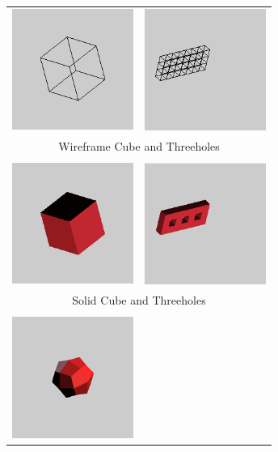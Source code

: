 \documentclass[12pt,a4paper]{scrartcl}
\begin{document}
\begin{longtable}{cc}
	\includegraphics[width=150px, height=150px]{Images/cube-wireframe.png} 
	& \includegraphics[width=150px, height=150px]{Images/threeholes-wireframe.png}  \\
	\multicolumn{2}{c}{Wireframe Cube and Threeholes} \\
	&\\
	\includegraphics[width=150px, height=150px]{Images/cube-solid.png} 
	& \includegraphics[width=150px, height=150px]{Images/threeholes-solid.png}  \\
	\multicolumn{2}{c}{Solid Cube and Threeholes} \\
	&\\
	\includegraphics[width=150px, height=150px]{Images/cube-1sd.png} 

\end{longtable}
\end{document}
